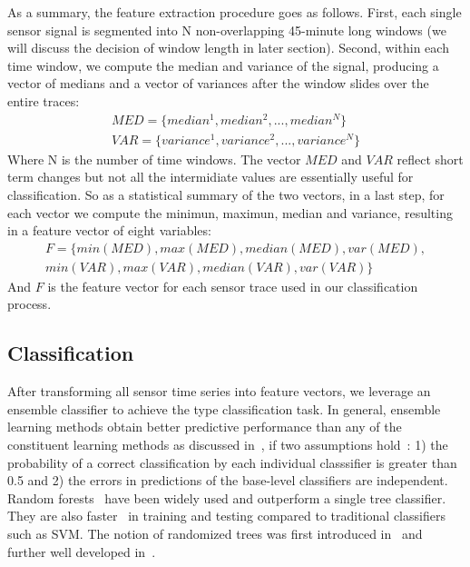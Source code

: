 As a summary, the feature extraction procedure goes as follows. First, each single sensor signal is segmented into N
non-overlapping 45-minute long windows (we will discuss the decision of window length in later section). Second, within
each time window, we compute the median and variance of the signal, producing a vector of medians and a vector of
variances after the window slides over the entire traces: 
\begin{displaymath}
\begin{split}
MED = \{median^{1}, median^{2}, ..., median^{N}\}\\
VAR = \{variance^{1}, variance^{2}, ..., variance^{N}\}
\end{split}
\end{displaymath}
Where N is the number of time windows. The vector $MED$ and $VAR$ reflect short term changes but not all the intermidiate values are essentially useful for classification. So as a statistical summary of the two vectors, in a last step, for each vector we compute the minimun, maximun, median and variance, resulting in a feature vector of eight variables:
\begin{displaymath}
\begin{split}
F = \{min(MED), max(MED), median(MED), var(MED),\\
 min(VAR), max(VAR), median(VAR), var(VAR)\}
\end{split}
\end{displaymath}
And $F$ is the feature vector for each sensor trace used in our classification process.

\subsection{Classification}
After transforming all sensor time series into feature vectors, we leverage an ensemble classifier to achieve 
the type classification task. In general, ensemble learning methods obtain better predictive performance than
 any of the constituent learning methods as discussed in~\cite{ensem1,ensem2}, if two assumptions hold~\cite{ensem3}: 1) the 
 probability of a correct classification by each individual classsifier is greater than 0.5 and 2) the errors
  in predictions of the base-level classifiers are independent. Random forests~\cite{RF} have been widely used 
  and outperform a single tree classifier. They are also faster~\cite{cvpr} in training and testing compared to traditional classifiers such as SVM. The notion of randomized trees was first introduced in~\cite{RT} and further well developed in~\cite{RF}.

